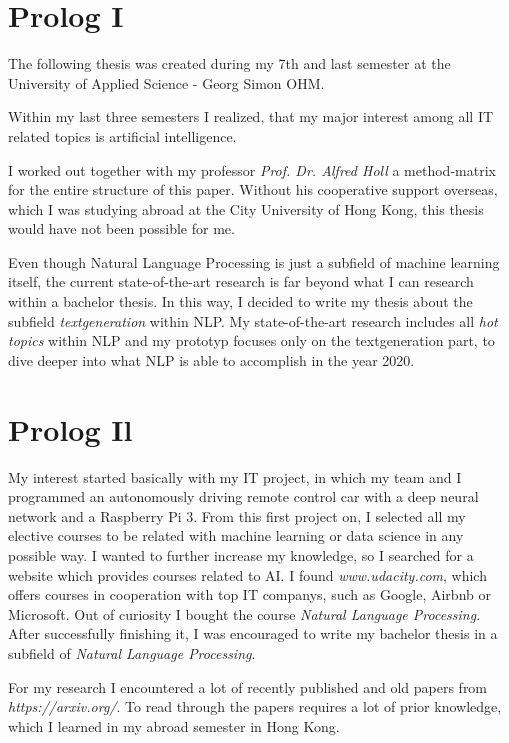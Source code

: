 \thispagestyle{empty}
\section*{Prolog I}
\label{sec:prolog}

The following thesis was created during my 7th and last semester at the University of Applied Science - Georg Simon OHM. 

Within my last three semesters I realized, that my major interest among all IT related topics is artificial intelligence.

I worked out together with my professor \textit{Prof. Dr. Alfred Holl} a method-matrix for the entire structure of this paper. Without his cooperative support overseas, which I was studying abroad at the City University of Hong Kong, this thesis would have not been possible for me.

Even though Natural Language Processing is just a subfield of machine learning itself, the current state-of-the-art research is far beyond what I can research within a bachelor thesis. In this way, I decided to write my thesis about the subfield \textit{textgeneration} within NLP. My state-of-the-art research includes all \textit{hot topics} within NLP and my prototyp focuses only on the textgeneration part, to dive deeper into what NLP is able to accomplish in the year 2020.

\newpage

\section*{Prolog Il}
\label{sec:prolog}

My interest started basically with my IT project, in which my team and I programmed an autonomously driving remote control car with a deep neural network and a Raspberry Pi 3. From this first project on, I selected all my elective courses to be related with machine learning or data science in any possible way. I wanted to further increase my knowledge, so I searched for a website which provides courses related to AI. I found \textit{www.udacity.com}, which offers courses  in cooperation with top IT companys, such as Google, Airbnb or Microsoft. Out of curiosity I bought the course \textit{Natural Language Processing}. After successfully finishing it, I was encouraged to write my bachelor thesis in a subfield of \textit{Natural Language Processing}. 

For my research I encountered a lot of recently published and old papers from \textit{https://arxiv.org/}. To read through the papers requires a lot of prior knowledge, which I learned in my abroad semester in Hong Kong. 

